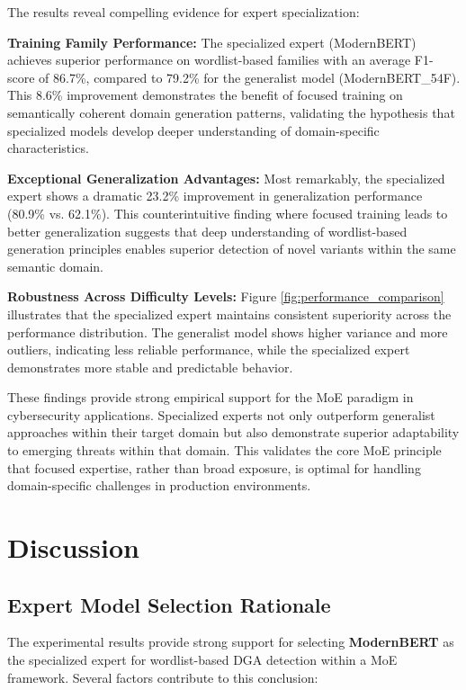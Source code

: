 \documentclass[a4paper]{llncs}
\begin{document}
The results reveal compelling evidence for expert specialization:

\textbf{Training Family Performance:} The specialized expert (ModernBERT) achieves superior performance on wordlist-based families with an average F1-score of 86.7\%, compared to 79.2\% for the generalist model (ModernBERT\_54F). This 8.6\% improvement demonstrates the benefit of focused training on semantically coherent domain generation patterns, validating the hypothesis that specialized models develop deeper understanding of domain-specific characteristics.

\textbf{Exceptional Generalization Advantages:} Most remarkably, the specialized expert shows a dramatic 23.2\% improvement in generalization performance (80.9\% vs. 62.1\%). This counterintuitive finding where focused training leads to better generalization suggests that deep understanding of wordlist-based generation principles enables superior detection of novel variants within the same semantic domain.

\textbf{Robustness Across Difficulty Levels:} Figure \ref{fig:performance_comparison} illustrates that the specialized expert maintains consistent superiority across the performance distribution. The generalist model shows higher variance and more outliers, indicating less reliable performance, while the specialized expert demonstrates more stable and predictable behavior.



These findings provide strong empirical support for the MoE paradigm in cybersecurity applications. Specialized experts not only outperform generalist approaches within their target domain but also demonstrate superior adaptability to emerging threats within that domain. This validates the core MoE principle that focused expertise, rather than broad exposure, is optimal for handling domain-specific challenges in production environments.

\section{Discussion}
\label{sec:discussion}

\subsection{Expert Model Selection Rationale}

The experimental results provide strong support for selecting \textbf{ModernBERT} as the specialized expert for wordlist-based DGA detection within a MoE framework. Several factors contribute to this conclusion:
\end{document}
